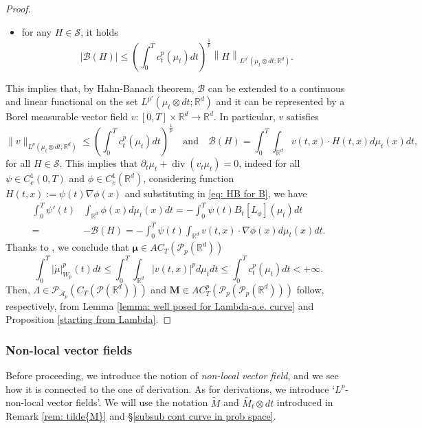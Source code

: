 \documentclass[10pt,leqno]{amsart}
\numberwithin{equation}{section}
\newcommand{\R}{\mathbb{R}}
\newcommand{\PP}{\mathcal{P}}
\begin{document}
\begin{proof}
\begin{itemize}
\begin{align*}
            \\
            & \quad \quad \quad \quad \leq \int_0^T c_t(\mu_t) \left\|\nabla_W \left(\sum_{i=1}^m\zeta_i(t) G_i - \sum_{k=1}^n \psi_k(t)F_k\right)(\cdot,\mu_t) \right\|_{L^{p'}(\mu_t)} dt = 0;
        \end{align*}
        \item for any $H \in \mathcal{S}$, it holds \[|\mathcal{B}(H)| \leq \left( 
        \int_0^T c_t^p(\mu_t) dt \right)^{\frac{1}{p}} \left\| 
        H\right\|_{L^{p'}(\mu_t\otimes dt;\R^d)}. \]
    \end{itemize}
        This implies that, by Hahn-Banach theorem, $\mathcal{B}$ can be extended to a continuous and linear functional on the set $L^{p'}(\mu_t\otimes dt; \R^d)$ and it can be represented by a Borel measurable vector field $v:[0,T]\times \R^d \to \R^d$. In particular, $v$ satisfies 
        \begin{equation}\label{eq: HB for B}\|v\|_{L^p(\mu_t\otimes dt;\R^d)} \leq\left( 
        \int_0^T c_t^p(\mu_t) dt \right)^{\frac{1}{p}} \quad \text{and} \quad \mathcal{B}(H) = \int_0^T \int_{\R^d} v(t,x) \cdot H(t,x) d\mu_t(x) dt,\end{equation}
        for all $H \in \mathcal{S}$. This implies that $\partial_t\mu_t + \operatorname{div}(v_t\mu_t) = 0$, indeed for all $\psi\in C_c^1(0,T)$ and $\phi\in C_c^1(\R^d)$, considering function $H(t,x):= \psi(t) \nabla\phi(x)$ and substituting in \eqref{eq: HB for B}, we have 
        \begin{align*}
            \int_0^T \psi'(t) & \int_{\R^d} \phi(x) d\mu_t(x) dt =  - \int_0^T \psi(t) B_t[L_\phi](\mu_t) dt 
            \\
            = &
            - \mathcal{B}(H) = - \int_0^T \psi(t) \int_{\R^d} v(t,x)\cdot \nabla\phi(x) d\mu_t(x) dt.
        \end{align*}
    Thanks to \cite[Theorem 8.3.1]{ambrosio2005gradient}, we conclude that $\boldsymbol{\mu}\in AC_T(\PP_p(\R^d))$
    \[\int_0^T |\dot\mu|_{W_p}^p(t) dt \leq \int_0^T \int_{\R^d} |v(t,x)|^p d\mu_t dt \leq \int_0^T c_t^p(\mu_t) dt<+\infty.\]
    Then, $\Lambda \in \PP_{\bar{\mathcal{A}}_p}(C_T(\PP(\R^d)))$ and $\boldsymbol{M}\in AC_T^p(\PP_p(\PP_p(\R^d)))$ follow, respectively, from Lemma \ref{lemma: well posed for Lambda-a.e. curve} and Proposition \ref{starting from Lambda}.
\end{proof}




\subsubsection{Non-local vector fields}
Before proceeding, we introduce the notion of \textit{non-local vector field}, and we see how it is connected to the one of derivation. As for derivations, we introduce 
`$L^p$-non-local vector fields'.
We will use the notation $\widetilde{M}$ and $\widetilde{M_t}\otimes dt$ introduced in Remark \ref{rem: tilde{M}} and §\ref{subsub cont curve in prob space}.
\end{document}
